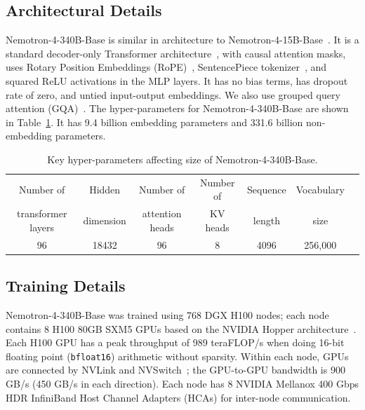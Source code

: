 \documentclass[11pt]{article}
\newcommand{\ours}{Nemotron-4-340B-Base}
\begin{document}
\subsection{Architectural Details} 


\ours{} is similar in architecture to Nemotron-4-15B-Base~\citep{parmar2024nemotron4}. 
It is a standard decoder-only Transformer architecture~\citep{DBLP:journals/corr/VaswaniSPUJGKP17}, with causal attention masks, uses Rotary Position Embeddings (RoPE)~\citep{su2021roformer}, SentencePiece tokenizer~\citep{kudo2018sentencepiece}, and squared ReLU activations in the MLP layers.
It has no bias terms, has dropout rate of zero, and untied input-output embeddings. 
We also use grouped query attention (GQA)~\citep{ainslie2023gqa}.
The hyper-parameters for \ours{} are shown in Table~\ref{tab:model_arch}. 
It has 9.4 billion embedding parameters and 331.6 billion non-embedding parameters.

\begin{table}[h]
    \centering
    \begin{tabular}{ccccccc}
    \toprule
    Number of          & Hidden    & Number of       & Number of & Sequence & Vocabulary \\
    transformer layers & dimension & attention heads &    KV heads                & length   & size \\
    \toprule
    96 & 18432 & 96 & 8 & 4096 & 256,000 \\
    \bottomrule
    \end{tabular}
    \caption{Key hyper-parameters affecting size of \ours{}.}
    \label{tab:model_arch}
\end{table}

\subsection{Training Details} 


\ours{} was trained using 768 DGX H100 nodes; each node contains 8 H100 80GB SXM5 GPUs based on the NVIDIA Hopper architecture~\citep{nvidia2022h100}. 
Each H100 GPU has a peak throughput of 989 teraFLOP/s when doing 16-bit floating point (\texttt{bfloat16}) arithmetic without sparsity. Within each node, GPUs are connected by NVLink and NVSwitch~\citep{nvlink}; the GPU-to-GPU bandwidth is 900 GB/s (450 GB/s in each direction). Each node has 8 NVIDIA Mellanox 400 Gbps HDR InfiniBand Host Channel Adapters (HCAs) for inter-node communication. 
\end{document}
